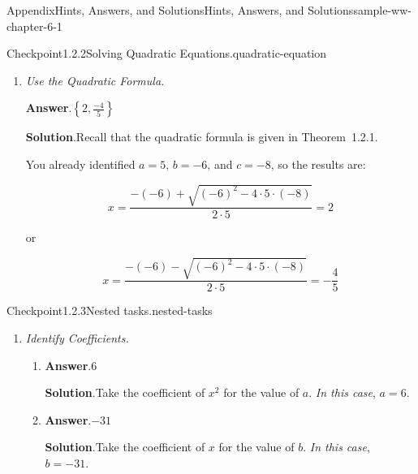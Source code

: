 \documentclass[oneside,10pt,]{book}
\newcommand{\blocktitlefont}{\relax}
\newcommand{\lititle}[1]{{\slshape#1}}
\numberwithin{equation}{section}
\begin{document}
\begin{solutions-chapter}{Appendix}{Hints, Answers, and Solutions}{}{Hints, Answers, and Solutions}{}{}{sample-ww-chapter-6-1}
\begin{inlinesolution}{Checkpoint}{1.2.2}{Solving Quadratic Equations.}{quadratic-equation}
\begin{enumerate}[font=\bfseries,label=(\alph*),ref=\alph*]
\item[(b)]\lititle{Use the Quadratic Formula.}\par%
\par\smallskip%
\noindent\textbf{\blocktitlefont Answer}.\hypertarget{quadratic-equation-4-3-back}{}\quad{}\(\left\{2,\frac{-4}{5}\right\}\)%
\par\smallskip%
\noindent\textbf{\blocktitlefont Solution}.\hypertarget{quadratic-equation-4-4-back}{}\quad{}Recall that the quadratic formula is given in Theorem~1.2.1.%
\par
You already identified \(a = {5}\text{,}\) \(b = {-6}\text{,}\) and \(c = {-8}\text{,}\) so the results are:%
\par
%
\begin{equation*}
x = {\frac{-\left(-6\right)+\sqrt{\left(-6\right)^{2}-4\cdot 5\cdot \left(-8\right)}}{2\cdot 5}} = {2}
\end{equation*}
%
\par
or%
\par
%
\begin{equation*}
x = {\frac{-\left(-6\right)-\sqrt{\left(-6\right)^{2}-4\cdot 5\cdot \left(-8\right)}}{2\cdot 5}} = {-{\frac{4}{5}}}
\end{equation*}
%
\end{enumerate}%
\end{inlinesolution}%
\begin{inlinesolution}{Checkpoint}{1.2.3}{Nested tasks.}{nested-tasks}%
\begin{enumerate}[font=\bfseries,label=(\alph*),ref=\alph*]%
\item[(a)]\lititle{Identify Coefficients.}\par%
\begin{enumerate}[font=\bfseries,label=(\roman*),ref=\theenumi.\roman*]%
\item[(i)]\noindent\textbf{\blocktitlefont Answer}.\hypertarget{nested-tasks-3-3-2-back}{}\quad{}\(6\)%
\par\smallskip%
\noindent\textbf{\blocktitlefont Solution}.\hypertarget{nested-tasks-3-3-3-back}{}\quad{}Take the coefficient of \(x^2\) for the value of \(a\text{.}\) \emph{In this case}, \(a = {6}\text{.}\)%
\item[(ii)]\noindent\textbf{\blocktitlefont Answer}.\hypertarget{nested-tasks-3-4-2-back}{}\quad{}\(-31\)%
\par\smallskip%
\noindent\textbf{\blocktitlefont Solution}.\hypertarget{nested-tasks-3-4-3-back}{}\quad{}Take the coefficient of \(x\) for the value of \(b\text{.}\) \emph{In this case}, \(b = {-31}\text{.}\)%

\end{enumerate}
\end{enumerate}
\end{inlinesolution}
\end{solutions-chapter}
\end{document}
